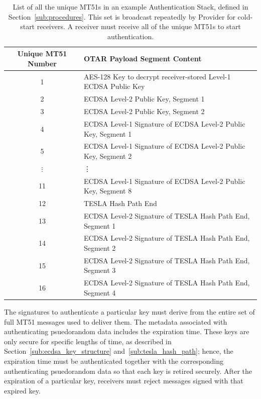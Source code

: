 \documentclass[APA,STIX1COL]{IONjournal/ION-APA Template}
\begin{document}
		\begin{table}%
			\center
			\begin{tabular}{|c|l|} \hline
				Unique MT51 Number & OTAR Payload Segment Content \\ \hline
				1 & AES-128 Key to decrypt receiver-stored Level-1 ECDSA Public Key \\ \hline
				2 & ECDSA Level-2 Public Key, Segment 1 \\ \hline
				3 & ECDSA Level-2 Public Key, Segment 2 \\ \hline
				4 & ECDSA Level-1 Signature of ECDSA Level-2 Public Key, Segment 1 \\ \hline
				5 & ECDSA Level-1 Signature of ECDSA Level-2 Public Key, Segment 2 \\ \hline
				$\vdots$ & \vdots \\ \hline
				11 & ECDSA Level-1 Signature of ECDSA Level-2 Public Key, Segment 8 \\ \hline
				12 & TESLA Hash Path End \\ \hline
				13 & ECDSA Level-2 Signature of TESLA Hash Path End, Segment 1 \\ \hline
				14 & ECDSA Level-2 Signature of TESLA Hash Path End, Segment 2 \\ \hline
				15 & ECDSA Level-2 Signature of TESLA Hash Path End, Segment 3 \\ \hline
				16 & ECDSA Level-2 Signature of TESLA Hash Path End, Segment 4 \\ \hline
			\end{tabular}
			\caption{
				List of all the unique MT51s in an example Authentication Stack, defined in Section~\ref{sub:procedures}.
				This set is broadcast repeatedly by Provider for cold-start receivers.
				A receiver must receive all of the unique MT51s to start authentication.
			}
			\label{tab: mt51-set}
		\end{table}

		The signatures to authenticate a particular key must derive from the entire set of full MT51 messages used to deliver them.
		The metadata associated with authenticating psuedorandom data includes the expiration time.
		These keys are only secure for specific lengths of time, as described in Section~\ref{sub:ecdsa_key_structure} and~\ref{sub:tesla_hash_path}; hence, the expiration time must be authenticated together with the corresponding authenticating psuedorandom data so that each key is retired securely.
		After the expiration of a particular key, receivers must reject messages signed with that expired key.
\end{document}
